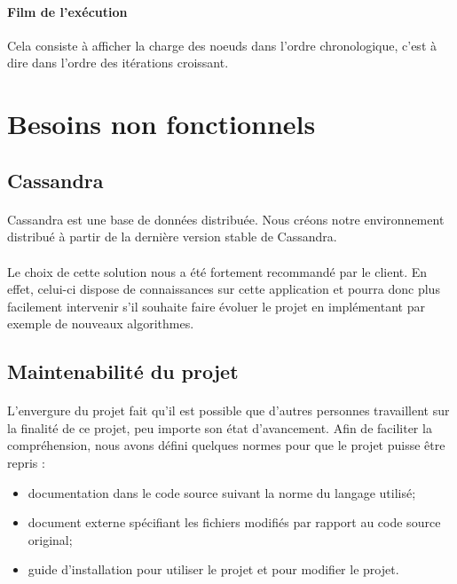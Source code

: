 \documentclass[12pt]{article}
\begin{document}
\paragraph{Film de l'exécution} Cela consiste à afficher la charge des noeuds dans l'ordre chronologique, c'est à dire dans l'ordre des itérations croissant.


\newpage

\section{Besoins non fonctionnels}

\subsection{Cassandra}

\paragraph{} Cassandra est une base de données distribuée.
Nous créons notre environnement distribué à partir de la dernière version stable de Cassandra.

\paragraph{} Le choix de cette solution nous a été fortement recommandé par le client.
En effet, celui-ci dispose de connaissances sur cette application et pourra donc plus facilement intervenir s'il souhaite faire évoluer le projet en implémentant par exemple de nouveaux algorithmes.


\subsection{Maintenabilité du projet}

\paragraph{} L'envergure du projet fait qu'il est possible que d'autres personnes travaillent sur la finalité de ce projet, peu importe son état d'avancement.
Afin de faciliter la compréhension, nous avons défini quelques normes pour que le projet puisse être repris :
\begin{itemize}
	\item documentation dans le code source suivant la norme du langage utilisé;
	\item document externe spécifiant les fichiers modifiés par rapport au code source original;
	\item guide d'installation pour utiliser le projet et pour modifier le projet.
\end{itemize}
\end{document}
